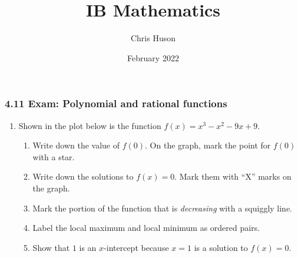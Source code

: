 \documentclass[12pt, twoside]{article}
\title{IB Mathematics}
\author{Chris Huson}
\date{February 2022}
\begin{document}
\subsubsection*{4.11 Exam: Polynomial and rational functions}
\begin{enumerate}
    \item Shown in the plot below is the function $f(x)=x^3-x^2-9x+9$.
    \begin{enumerate}
        \item Write down the value of $f(0)$. On the graph, mark the point for $f(0)$ with a star.\vspace{0.75cm}
        \item Write down the solutions to $f(x)=0$. Mark them with ``X'' marks on the graph.\vspace{0.75cm}
        \item Mark the portion of the function that is \emph{decreasing} with a squiggly line.
        \item Label the local maximum and local minimum as ordered pairs.
        \item Show that $1$ is an $x$-intercept because $x=1$ is a solution to $f(x)=0$.
    \end{enumerate}
    \begin{center}
    \end{center}


\end{enumerate}
\end{document}
